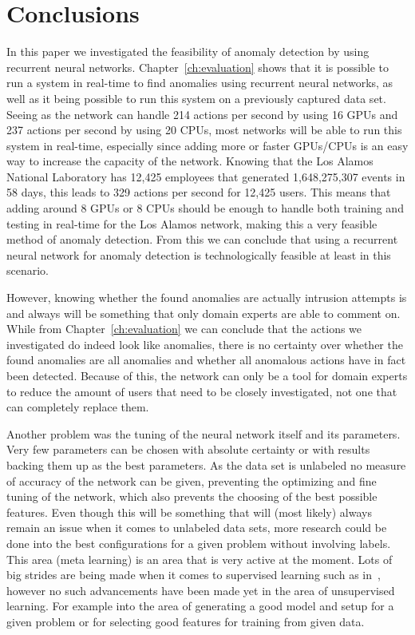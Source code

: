 \chapter{Conclusions}\label{ch:conclusions}

In this paper we investigated the feasibility of anomaly detection by using recurrent neural networks. Chapter~\ref{ch:evaluation} shows that it is possible to run a system in real-time to find anomalies using recurrent neural networks, as well as it being possible to run this system on a previously captured data set. Seeing as the network can handle 214 actions per second by using 16 GPUs and 237 actions per second by using 20 CPUs, most networks will be able to run this system in real-time, especially since adding more or faster GPUs/CPUs is an easy way to increase the capacity of the network. Knowing that the Los Alamos National Laboratory has 12,425 employees that generated 1,648,275,307 events in 58 days, this leads to 329 actions per second for 12,425 users. This means that adding around 8 GPUs or 8 CPUs should be enough to handle both training and testing in real-time for the Los Alamos network, making this a very feasible method of anomaly detection. From this we can conclude that using a recurrent neural network for anomaly detection is technologically feasible at least in this scenario. 

However, knowing whether the found anomalies are actually intrusion attempts is and always will be something that only domain experts are able to comment on. While from Chapter~\ref{ch:evaluation} we can conclude that the actions we investigated do indeed look like anomalies, there is no certainty over whether the found anomalies are all anomalies and whether all anomalous actions have in fact been detected. Because of this, the network can only be a tool for domain experts to reduce the amount of users that need to be closely investigated, not one that can completely replace them. 

Another problem was the tuning of the neural network itself and its parameters. Very few parameters can be chosen with absolute certainty or with results backing them up as the best parameters. As the data set is unlabeled no measure of accuracy of the network can be given, preventing the optimizing and fine tuning of the network, which also prevents the choosing of the best possible features. Even though this will be something that will (most likely) always remain an issue when it comes to unlabeled data sets, more research could be done into the best configurations for a given problem without involving labels. This area (meta learning) is an area that is very active at the moment. Lots of big strides are being made when it comes to supervised learning such as in~\cite{zoph2016neural}, however no such advancements have been made yet in the area of unsupervised learning. For example into the area of generating a good model and setup for a given problem or for selecting good features for training from given data.
